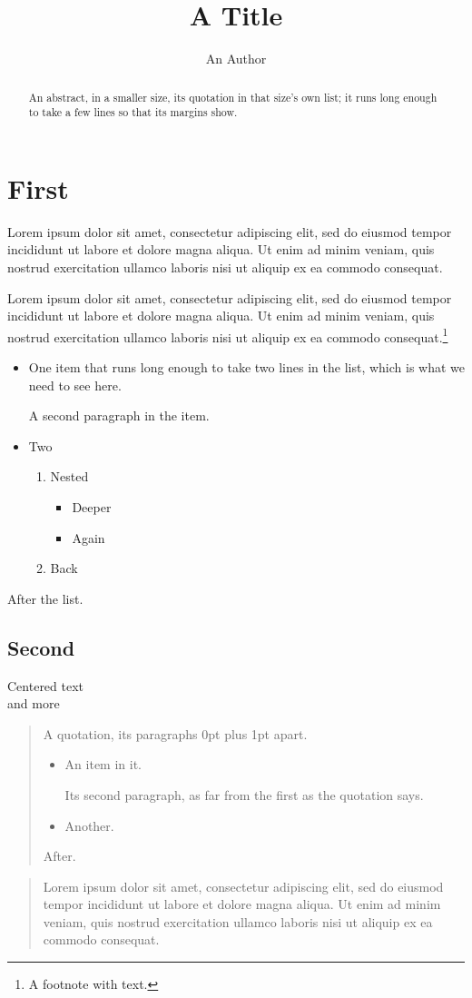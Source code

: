 \documentclass{article}
\title{A Title}
\author{An Author}
\date{}
\begin{document}
\maketitle
\tableofcontents
\section{First}
Lorem ipsum dolor sit amet, consectetur adipiscing elit, sed do eiusmod tempor incididunt ut labore et dolore magna aliqua. Ut enim ad minim veniam, quis nostrud exercitation ullamco laboris nisi ut aliquip ex ea commodo consequat.

Lorem ipsum dolor sit amet, consectetur adipiscing elit, sed do eiusmod tempor incididunt ut labore et dolore magna aliqua. Ut enim ad minim veniam, quis nostrud exercitation ullamco laboris nisi ut aliquip ex ea commodo consequat.\footnote{A footnote with text.}
\begin{itemize}
\item One item that runs long enough to take two lines in the list, which is what we need to see here.

A second paragraph in the item.
\item Two
\begin{enumerate}
\item Nested
\begin{itemize}\item Deeper\item Again\end{itemize}
\item Back
\end{enumerate}
\end{itemize}
After the list.
\subsection{Second}
\begin{abstract}
An abstract, in a smaller size, its quotation in that size's own list; it runs long enough to take a few lines so that its margins show.
\end{abstract}
\begin{center}Centered text\\and more\end{center}
\begin{quotation}A quotation, its paragraphs 0pt plus 1pt apart.
\begin{itemize}\item An item in it.

Its second paragraph, as far from the first as the quotation says.\item Another.\end{itemize}
After.\end{quotation}
\begin{quote}Lorem ipsum dolor sit amet, consectetur adipiscing elit, sed do eiusmod tempor incididunt ut labore et dolore magna aliqua. Ut enim ad minim veniam, quis nostrud exercitation ullamco laboris nisi ut aliquip ex ea commodo consequat.\end{quote}
\end{document}
